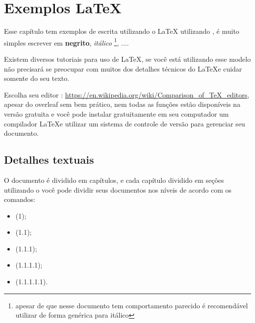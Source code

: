 \chapter{Exemplos \LaTeX}
\label{cap-exemplos}



Esse capítulo tem exemplos de escrita utilizando o {\LaTeX}  utilizando \abnTeX, é muito simples escrever em \textbf{negrito}, \textit{itálico} \footnote{apesar de que nesse documento   tem comportamento parecido é recomendável utilizar  de forma genérica para itálico}, ....


Existem diversos tutoriais para uso de \LaTeX, se você está utilizando esse modelo não precisará se preocupar com muitos dos detalhes técnicos do \LaTeX \space e cuidar somente do seu texto.

Escolha seu editor : \url{https://en.wikipedia.org/wiki/Comparison\_of\_TeX\_editors}, apesar do overleaf sem bem prático, nem todas as funções estão disponíveis na versão gratuita e você pode instalar gratuitamente em seu computador um compilador \LaTeX \space e utilizar um sistema de controle de versão para gerenciar seu documento.




\section{Detalhes textuais}

O documento é dividido em capítulos, e cada capítulo dividido em seções utilizando o \abnTeX \space você pode dividir seus documentos nos níveis de acordo com os comandos:

\begin{itemize}
    \item {}  (1);
    
    \item {} (1.1);
    
    \item {} (1.1.1);
    
    \item {} (1.1.1.1);
    
    \item {} (1.1.1.1.1).
    
\end{itemize}

